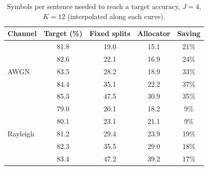 \begin{table}[!t]
  \centering
  \caption{Fixed cap $K{=}8$, $J{=}4$, $\lambda{=}0$: mean accuracy (\%)
           and difference from the equal split (points, 95\% CI). Every
           method sends 32 symbols except the oracle (22.9).}
  \label{tab:cap8}
  \footnotesize
  \setlength{\tabcolsep}{2.5pt}
\end{table}

\begin{table}[!t]
  \centering
  \caption{Symbols per sentence needed to reach a target accuracy,
           $J{=}4$, $K{=}12$ (interpolated along each curve).}
  \label{tab:target}
  \footnotesize
  \setlength{\tabcolsep}{4pt}
  \begin{tabular}{lcccc}
    \toprule
    Channel & Target (\%) & Fixed splits & Allocator & Saving \\
    \midrule
    \multirow{5}{*}{AWGN}
      & 81.8 & 19.0 & 15.1 & 21\% \\
      & 82.6 & 22.1 & 16.9 & 24\% \\
      & 83.5 & 28.2 & 18.9 & 33\% \\
      & 84.4 & 35.1 & 22.2 & 37\% \\
      & 85.3 & 47.5 & 30.9 & 35\% \\
    \midrule
    \multirow{5}{*}{Rayleigh}
      & 79.0 & 20.1 & 18.2 & 9\% \\
      & 80.1 & 23.1 & 21.1 & 9\% \\
      & 81.2 & 29.4 & 23.9 & 19\% \\
      & 82.3 & 35.5 & 29.0 & 18\% \\
      & 83.4 & 47.2 & 39.2 & 17\% \\
    \bottomrule
  \end{tabular}
\end{table}


